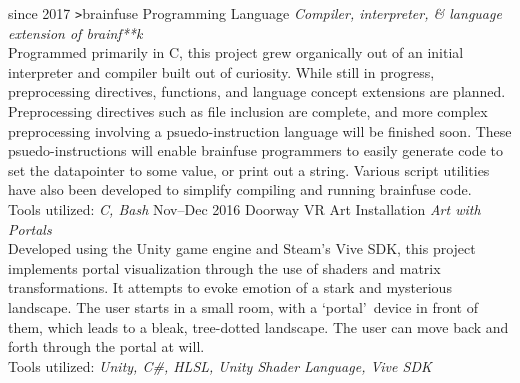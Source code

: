 \documentclass[]{friggeri-cv}
\begin{document}
\begin{entrylist}
  \entry
    {since 2017}
    {\texttt{>}brainfuse}
    {Programming Language}
    {\emph{Compiler, interpreter, \& language extension of brainf**k}\\Programmed primarily in C, this project grew organically out of an initial interpreter and compiler built out of curiosity. While still in progress, preprocessing directives, functions, and language concept extensions are planned. Preprocessing directives such as file inclusion are complete, and more complex preprocessing involving a psuedo-instruction language will be finished soon. These psuedo-instructions will enable brainfuse programmers to easily generate code to set the datapointer to some value, or print out a string. Various script utilities have also been developed to simplify compiling and running brainfuse code.\\Tools utilized: \emph{C, Bash}}
  \entry
    {Nov--Dec 2016}
    {Doorway}
    {VR Art Installation}
    {\emph{Art with Portals}\\Developed using the Unity game engine and Steam's Vive SDK, this project implements portal visualization through the use of shaders and matrix transformations. It attempts to evoke emotion of a stark and mysterious landscape. The user starts in a small room, with a \lq portal\rq\ device in front of them, which leads to a bleak, tree-dotted landscape. The user can move back and forth through the portal at will.\\Tools utilized: \emph{Unity, C\#, HLSL, Unity Shader Language, Vive SDK}}
\end{entrylist}
\end{document}
